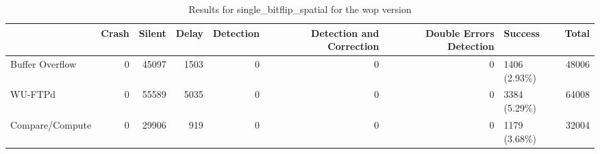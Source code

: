 \begin{table}[t]
    \centering
    \caption{Results for single_bitflip_spatial for the wop version}
    \label{table:end_sim_by_status_wop_1_single_bitflip_spatial}
    \begin{tabular}{lrrrrrrlr}
        \toprule
                        & Crash & Silent & Delay & Detection & Detection and Correction & Double Errors Detection & Success       & Total \\
        \midrule
        Buffer Overflow & 0     & 45097  & 1503  & 0         & 0                        & 0                       & 1406 (2.93\%) & 48006 \\
        WU-FTPd         & 0     & 55589  & 5035  & 0         & 0                        & 0                       & 3384 (5.29\%) & 64008 \\
        Compare/Compute & 0     & 29906  & 919   & 0         & 0                        & 0                       & 1179 (3.68\%) & 32004 \\
        \bottomrule
    \end{tabular}
\end{table}

